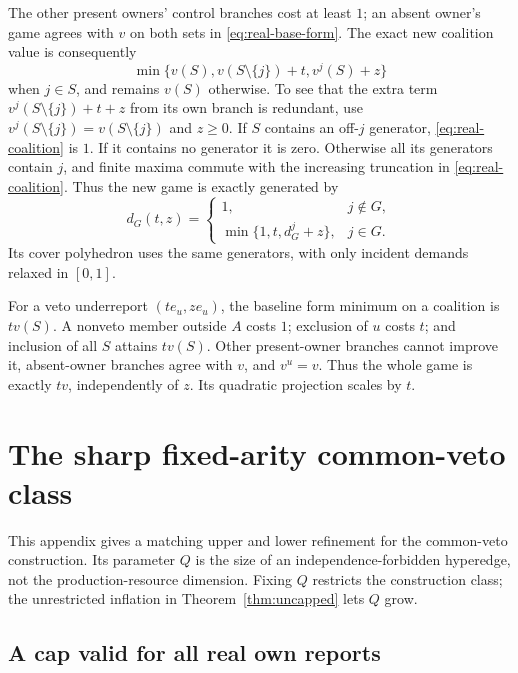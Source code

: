 The other present owners' control branches cost at least $1$; an absent
owner's game agrees with $v$ on both sets in \eqref{eq:real-base-form}.
The exact new coalition value is consequently
\begin{equation}
 \min\{v(S),v(S\setminus\{j\})+t,v^j(S)+z\}
 \label{eq:real-coalition}
\end{equation}
when $j\in S$, and remains $v(S)$ otherwise.  To see that the extra
term $v^j(S\setminus\{j\})+t+z$ from its own branch is redundant, use
$v^j(S\setminus\{j\})=v(S\setminus\{j\})$ and $z\ge0$.
If $S$ contains an off-$j$ generator, \eqref{eq:real-coalition} is $1$.
If it contains no generator it is zero.  Otherwise all its generators
contain $j$, and finite maxima commute with the increasing truncation
in \eqref{eq:real-coalition}.  Thus the new game is exactly generated by
\begin{equation}
 d_G(t,z)=
 \begin{cases}
 1,&j\notin G,\\
 \min\{1,t,d_G^j+z\},&j\in G.
 \end{cases}
 \label{eq:real-generator-demands}
\end{equation}
Its cover polyhedron uses the same generators, with only incident demands
relaxed in $[0,1]$.

For a veto underreport $(t e_u,z e_u)$, the baseline form minimum on a
coalition is $t v(S)$.  A nonveto member outside $A$ costs $1$; exclusion
of $u$ costs $t$; and inclusion of all $S$ attains $t v(S)$.
Other present-owner branches cannot improve it, absent-owner branches
agree with $v$, and $v^u=v$.  Thus the whole game is exactly $tv$,
independently of $z$.  Its quadratic projection scales by $t$.

\section{The sharp fixed-arity common-veto class}
\label{app:sharp-class}

This appendix gives a matching upper and lower refinement for the
common-veto construction.  Its parameter $Q$ is the size of an
independence-forbidden hyperedge, not the production-resource dimension.
Fixing $Q$ restricts the construction class; the unrestricted inflation
in Theorem~\ref{thm:uncapped} lets $Q$ grow.

\subsection{A cap valid for all real own reports}


